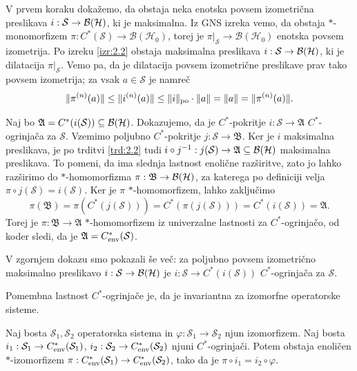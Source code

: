 \begin{dokaz}
    V prvem koraku dokažemo, da obstaja neka enotska povsem izometrična preslikava $i: \mathcal{S} \to \operatorname{\mathcal{B} (\mathcal{H})}$,
    ki je maksimalna. Iz GNS izreka vemo, da obstaja $*$-monomorfizem $\pi: C^*(\mathcal{S}) \to \mathcal{B}(\mathcal{H}_0)$,
    torej je $\pi|_{\mathcal{S}} \to \mathcal{B}(\mathcal{H}_0)$ enotska povsem izometrija. Po izreku 
    \ref{izr:2.2} obstaja maksimalna preslikava $i: \mathcal{S} \to \operatorname{\mathcal{B} (\mathcal{H})}$, ki je dilatacija $\pi|_\mathcal{S}$.
    Vemo pa, da je dilatacija povsem izometrične preslikave prav tako povsem izometrija; za vsak $a \in \mathcal{S}$ je namreč 
    $$\| \pi^{(n)} (a)\| \leq \| i^{(n)} (a)\| \leq \| i \|_{\operatorname{po}} \cdot \| a\| = \| a\| = \| \pi^{(n)} (a)\|.$$

    Naj bo $\mathfrak{A} = C^* (i (\mathcal{S})) \subseteq \operatorname{\mathcal{B} (\mathcal{H})}$.
    Dokazujemo, da je $C^*$-pokritje $i: \mathcal{S} \to \mathfrak{A}$ $C^*$-ogrinjača za $\mathcal{S}$.
    Vzemimo poljubno $C^*$-pokritje $j: \mathcal{S} \to \mathfrak{B}$. Ker je $i$ maksimalna preslikava,
    je po trditvi \ref{trd:2.2} tudi $i \circ j^{-1}: j(\mathcal{S}) \to \mathfrak{A} \subseteq \operatorname{\mathcal{B} (\mathcal{H})}$ maksimalna preslikava.
    To pomeni, da ima slednja lastnost enolične razširitve, zato jo lahko razširimo 
    do $*$-homomorfizma $\pi: \mathfrak{B} \to \operatorname{\mathcal{B} (\mathcal{H})}$, za katerega po definiciji velja $\pi \circ j ({\mathcal{S}}) = i(\mathcal{S})$. 
    Ker je $\pi$ $*$-homomorfizem, lahko zaključimo 
    $$\pi (\mathfrak{B}) = \pi (C^* (j(\mathcal{S}))) = C^* (\pi (j(\mathcal{S}))) = C^* (i(\mathcal{S})) = \mathfrak{A}.$$
    Torej je $\pi: \mathfrak{B} \to \mathfrak{A}$ $*$-homomorfizem iz univerzalne lastnosti za $C^*$-ogrinjačo, od koder sledi, da je $\mathfrak{A} = C^* _{\operatorname{env}} (\mathcal{S})$.
\end{dokaz}

\begin{opomba}
    V zgornjem dokazu smo pokazali še več: za poljubno povsem izometrično maksimalno preslikavo 
    $i: \mathcal{S} \to \operatorname{\mathcal{B} (\mathcal{H})}$ je $i: \mathcal{S} \to C^*(i(\mathcal{S}))$ $C^*$-ogrinjača za $\mathcal{S}$.
\end{opomba}

Pomembna lastnost $C^*$-ogrinjače je, da je invariantna za izomorfne operatorske sisteme. 

\begin{trditev}
    Naj bosta $\mathcal{S}_1, \mathcal{S}_2$ operatorska sistema in $\varphi: \mathcal{S}_1 \to \mathcal{S}_2$ 
    njun izomorfizem. Naj bosta 
    $i_1: \mathcal{S}_1 \to C_{\operatorname{env}} ^* (\mathcal{S}_1)$, $i_2: \mathcal{S}_2 \to C_{\operatorname{env}} ^* (\mathcal{S}_2)$ 
    njuni $C^*$-ogrinjači.
    Potem obstaja enoličen $*$-izomorfizem $\pi: C_{\operatorname{env}} ^* (\mathcal{S}_1) \to C_{\operatorname{env}} ^* (\mathcal{S}_2)$, 
    tako da je $\pi \circ i_1 = i_2 \circ \varphi$.
\end{trditev}

